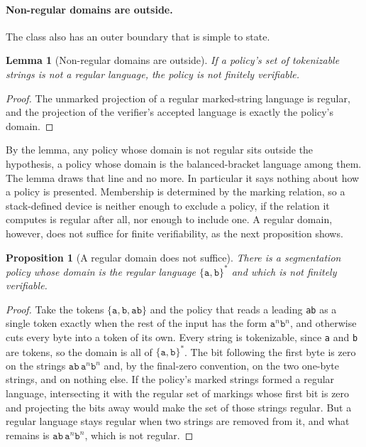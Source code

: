 \documentclass[11pt,a4paper]{article}
\theoremstyle{definition}
\theoremstyle{plain}
\newtheorem{lemma}{Lemma}
\newtheorem{proposition}{Proposition}
\newcommand{\code}[1]{\texttt{#1}}
\begin{document}
\paragraph{Non-regular domains are outside.} The class also has an outer boundary that is simple to state.

\begin{lemma}[Non-regular domains are outside]\label{lem:outside}
If a policy's set of tokenizable strings is not a regular language, the policy is not finitely verifiable.
\end{lemma}

\begin{proof}
The unmarked projection of a regular marked-string language is regular, and the projection of the verifier's accepted
language is exactly the policy's domain.
\end{proof}

By the lemma, any policy whose domain is not regular sits outside the hypothesis, a policy whose domain is the
balanced-bracket language among them. The lemma draws that line and no more. In particular it says nothing about how a
policy is presented. Membership is determined by the marking relation, so a stack-defined device is neither enough to
exclude a policy, if the relation it computes is regular after all, nor enough to include one. A regular domain,
however, does not suffice for finite verifiability, as the next proposition shows.

\begin{proposition}[A regular domain does not suffice]\label{prop:regular-domain}
There is a segmentation policy whose domain is the regular language $\{\code{a}, \code{b}\}^{*}$ and which is not
finitely verifiable.
\end{proposition}

\begin{proof}
Take the tokens $\{\code{a}, \code{b}, \code{ab}\}$ and the policy that reads a leading \code{ab} as a single token
exactly when the rest of the input has the form $\code{a}^{n}\code{b}^{n}$, and otherwise cuts every byte into a token
of its own. Every string is tokenizable, since \code{a} and \code{b} are tokens, so the domain is all of
$\{\code{a}, \code{b}\}^{*}$. The bit following the first byte is zero on the strings
$\code{ab}\,\code{a}^{n}\code{b}^{n}$ and, by the final-zero convention, on the two one-byte strings, and on nothing
else. If the policy's marked strings formed a regular language, intersecting it with the regular set of markings whose
first bit is zero and projecting the bits away would make the set of those strings regular. But a regular language stays
regular when two strings are removed from it, and what remains is $\code{ab}\,\code{a}^{n}\code{b}^{n}$, which is not
regular.
\end{proof}
\end{document}
